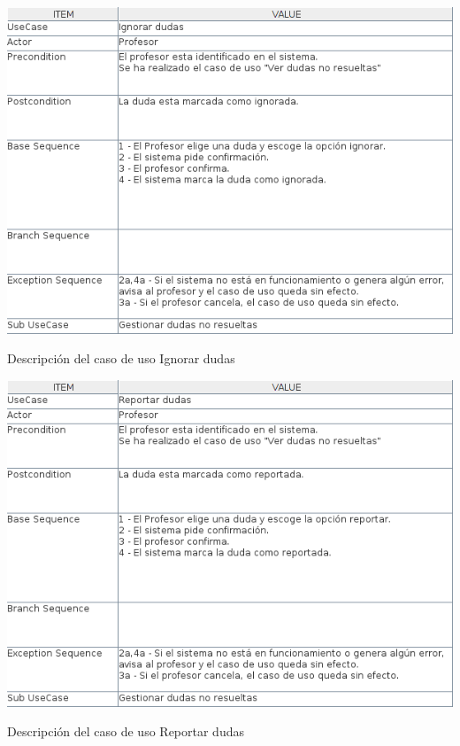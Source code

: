 \documentclass[openright,twoside,10pt]{book}
\begin{document}
    \vspace*{\fill}
    
    \newpage
    
    \vspace*{\fill}
    
    \begin{table}[H]
        \begin{center}
            \includegraphics[width=\textwidth]{img/astah/analisis/casos_de_uso/useCase09.png}
        \end{center}
        \caption{Descripción del caso de uso Ignorar dudas}
    \end{table}
    
    \vspace*{\fill}
    
    \newpage
    
    \vspace*{\fill}
    
    \begin{table}[H]
        \begin{center}
            \includegraphics[width=\textwidth]{img/astah/analisis/casos_de_uso/useCase10.png}
        \end{center}
        \caption{Descripción del caso de uso Reportar dudas}
    \end{table}
    
\end{document}
